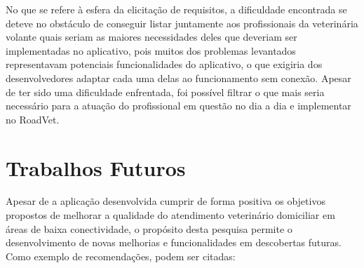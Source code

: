 No que se refere à esfera da elicitação de requisitos, a dificuldade encontrada se deteve no obstáculo de conseguir listar juntamente aos profissionais da veterinária volante quais seriam as maiores necessidades deles que deveriam ser implementadas no aplicativo, pois muitos dos problemas levantados representavam potenciais funcionalidades do aplicativo, o que exigiria dos desenvolvedores adaptar cada uma delas ao funcionamento sem conexão. Apesar de ter sido uma dificuldade enfrentada, foi possível filtrar o que mais seria necessário para a atuação do profissional em questão no dia a dia e implementar no RoadVet.

\section{Trabalhos Futuros}
Apesar de a aplicação desenvolvida cumprir de forma positiva os objetivos propostos de melhorar a qualidade do atendimento veterinário domiciliar em áreas de baixa conectividade, o propósito desta pesquisa permite o desenvolvimento de novas melhorias e funcionalidades em descobertas futuras. Como exemplo de recomendações, podem ser citadas: 

